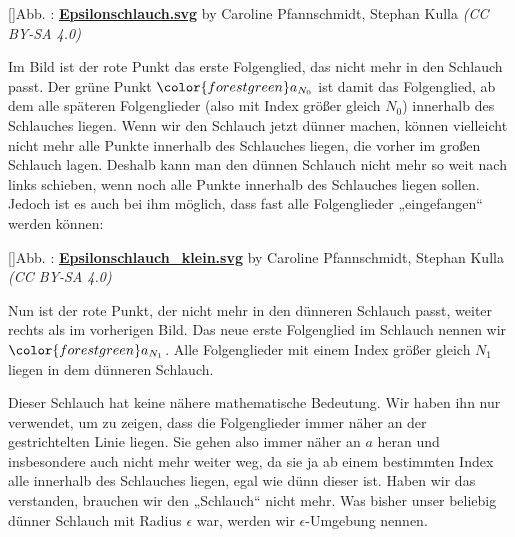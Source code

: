 \documentclass[fontsize=9pt,
               parskip=half-,
               DIV=14,
               listof=chapterentry,
               tocflat]{scrbook}
\newcounter{imagelabel}
\begin{document}
[]{Abb. : \protect\href{https://commons.wikimedia.org/wiki/File:Epsilonschlauch.svg}{\textbf{Epsilonschlauch.svg}} by Caroline Pfannschmidt, Stephan Kulla \textit{(CC BY-SA 4.0)}}\begin{center}
\end{center}

Im Bild ist der rote Punkt das erste Folgenglied, das nicht mehr in den Schlauch passt. Der grüne Punkt ${\color {forestgreen}a_{N_{0}}}$ ist damit das Folgenglied, ab dem alle späteren Folgenglieder (also mit Index größer gleich $N_{0}$) innerhalb des Schlauches liegen. Wenn wir den Schlauch jetzt dünner machen, können vielleicht nicht mehr alle Punkte innerhalb des Schlauches liegen, die vorher im großen Schlauch lagen. Deshalb kann man den dünnen Schlauch nicht mehr so weit nach links schieben, wenn noch alle Punkte innerhalb des Schlauches liegen sollen. Jedoch ist es auch bei ihm möglich, dass fast alle Folgenglieder „eingefangen“ werden können:

[]{Abb. : \protect\href{https://commons.wikimedia.org/wiki/File:Epsilonschlauch_klein.svg}{\textbf{Epsilonschlauch\allowbreak\_klein.svg}} by Caroline Pfannschmidt, Stephan Kulla \textit{(CC BY-SA 4.0)}}\begin{center}
\end{center}

Nun ist der rote Punkt, der nicht mehr in den dünneren Schlauch passt, weiter rechts als im vorherigen Bild. Das neue erste Folgenglied im Schlauch nennen wir ${\color {forestgreen}a_{N_{1}}}$. Alle Folgenglieder mit einem Index größer gleich $N_{1}$ liegen in dem dünneren Schlauch.

Dieser Schlauch hat keine nähere mathematische Bedeutung. Wir haben ihn nur verwendet, um zu zeigen, dass die Folgenglieder immer näher an der gestrichtelten Linie liegen. Sie gehen also immer näher an $a$ heran und insbesondere auch nicht mehr weiter weg, da sie ja ab einem bestimmten Index alle innerhalb des Schlauches liegen, egal wie dünn dieser ist. Haben wir das verstanden, brauchen wir den „Schlauch“ nicht mehr. Was bisher unser beliebig dünner Schlauch mit Radius $\epsilon $ war, werden wir $\epsilon $-Umgebung nennen.
\end{document}
